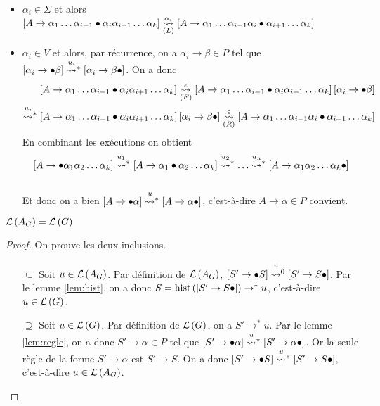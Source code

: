 \documentclass[../../agregation.tex]{subfiles}
\begin{document}
\begin{itemize}
	\begin{itemize}
		\item $\alpha_{i}\in\Sigma$ et alors $\left[A\to\alpha_{1}\dots\alpha_{i-1}\bullet\alpha_{i}\alpha_{i+1}\dots\alpha_{k}\right]\underset{(L)}{\overset{\alpha_{i}}{\leadsto}}\left[A\to\alpha_{1}\dots\alpha_{i-1}\alpha_{i}\bullet\alpha_{i+1}\dots\alpha_{k}\right]$
		\item $\alpha_{i}\in V$ et alors, par récurrence, on a $\alpha_{i}\to\beta\in P$
		tel que $\left[\alpha_{i}\to\bullet\beta\right]\transitionn{u_{i}}*\left[\alpha_{i}\to\beta\bullet\right]$.
		On a donc
		\begin{align*}
		\left[A\to\alpha_{1}\dots\alpha_{i-1}\bullet\alpha_{i}\alpha_{i+1}\dots\alpha_{k}\right]\underset{(E)}{\transition{\varepsilon}}\left[A\to\alpha_{1}\dots\alpha_{i-1}\bullet\alpha_{i}\alpha_{i+1}\dots\alpha_{k}\right]\left[\alpha_{i}\to\bullet\beta\right]\\
		\transitionn{u_{i}}*\left[A\to\alpha_{1}\dots\alpha_{i-1}\bullet\alpha_{i}\alpha_{i+1}\dots\alpha_{k}\right]\left[\alpha_{i}\to\beta\bullet\right]\underset{(R)}{\transition{\varepsilon}}\left[A\to\alpha_{1}\dots\alpha_{i-1}\alpha_{i}\bullet\alpha_{i+1}\dots\alpha_{k}\right]
		\end{align*}
		En combinant les exécutions on obtient
		\[
		\left[A\to\bullet\alpha_{1}\alpha_{2}\dots\alpha_{k}\right]\transitionn{u_{1}}*\left[A\to\alpha_{1}\bullet\alpha_{2}\dots\alpha_{k}\right]\transitionn{u_{2}}*\dots\transitionn{u_{n}}*\left[A\to\alpha_{1}\alpha_{2}\dots\alpha_{k}\bullet\right]
		\]
		\\
		Et donc on a bien $\left[A\to\bullet\alpha\right]\transitionn u*\left[A\to\alpha\bullet\right]$,
		c'est-à-dire $A\to\alpha\in P$ convient.
	\end{itemize}
\end{itemize}
\begin{thm}
	$\mathcal{L}\left(A_{G}\right)=\mathcal{L}\left(G\right)$
\end{thm}
\begin{proof}On prouve les deux inclusions.
	\begin{itemize}
		\item[\og $\subseteq$ \fg{}]  Soit $u\in\mathcal{L}\left(A_{G}\right)$. Par définition de $\mathcal{L}\left(A_{G}\right)$,
		$\left[S'\to\bullet S\right]\transitionn u0\left[S'\to S\bullet\right]$.
		Par le lemme \ref{lem:hist}, on a donc $S=\operatorname{hist}\left(\left[S'\to S\bullet\right]\right)\to^{*}u$,
		c'est-à-dire $u\in\mathcal{L}\left(G\right)$.
		\item[\og $\supseteq$ \fg{}]  Soit $u\in\mathcal{L}\left(G\right)$. Par définition de $\mathcal{L}\left(G\right)$,
		on a $S'\to^{*}u$. Par le lemme \ref{lem:regle}, on a donc $S'\to\alpha\in P$
		tel que $\left[S'\to\bullet\alpha\right]\transitionn u*\left[S'\to\alpha\bullet\right]$.
		Or la seule règle de la forme $S'\to\alpha$ est $S'\to S$. On a
		donc $\left[S'\to\bullet S\right]\transitionn u*\left[S'\to S\bullet\right]$,
		c'est-à-dire $u\in\mathcal{L}\left(A_{G}\right)$.
	\end{itemize}
\end{proof}
\end{document}
